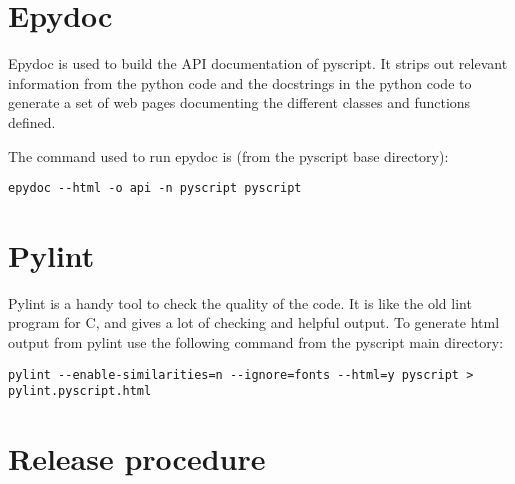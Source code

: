 \documentclass[12pt,a4paper]{article}
\begin{document}
\section{Epydoc}

Epydoc is used to build the API documentation of pyscript.  It strips out
relevant information from the python code and the docstrings in the python
code to generate a set of web pages documenting the different classes and
functions defined.

The command used to run epydoc is (from the pyscript base directory):
\begin{verbatim}
epydoc --html -o api -n pyscript pyscript
\end{verbatim}

\section{Pylint}

Pylint is a handy tool to check the quality of the code.  It is like the old
lint program for C, and gives a lot of checking and helpful output.  To
generate html output from pylint use the following command from the pyscript
main directory:
\begin{verbatim}
pylint --enable-similarities=n --ignore=fonts --html=y pyscript > pylint.pyscript.html
\end{verbatim}

\section{Release procedure}
\end{document}
